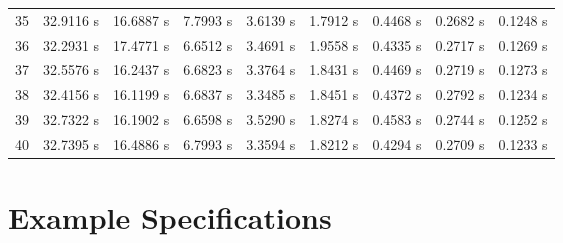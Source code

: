 \begin{landscape}
\begin{longtable}{cllllllll}
    35 &32.9116 s& 16.6887 s& 7.7993 s& 3.6139 s& 1.7912 s& 0.4468 s& 0.2682 s& 0.1248 s\\
    36 &32.2931 s& 17.4771 s& 6.6512 s& 3.4691 s& 1.9558 s& 0.4335 s& 0.2717 s& 0.1269 s\\
    37 &32.5576 s& 16.2437 s& 6.6823 s& 3.3764 s & 1.8431 s& 0.4469 s& 0.2719 s& 0.1273 s\\
    38 &32.4156 s& 16.1199 s & 6.6837 s& 3.3485 s& 1.8451 s& 0.4372 s& 0.2792 s& 0.1234 s\\
    39 &32.7322 s& 16.1902 s& 6.6598 s & 3.5290 s& 1.8274 s& 0.4583 s& 0.2744 s & 0.1252 s\\
    40 &32.7395 s& 16.4886 s& 6.7993 s& 3.3594 s& 1.8212 s& 0.4294 s& 0.2709 s& 0.1233 s
    \label{table:instrumented_amount_benchmark}
  \end{longtable}
\end{landscape}

\clearpage

\section{Example  Specifications}
\label{sec:appendix:tessla_specs}


\clearpage


